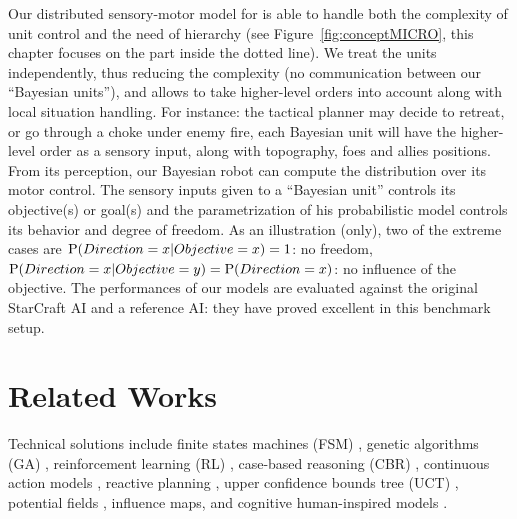 Our distributed sensory-motor model for  is able to handle both the complexity of unit control and the need of hierarchy (see Figure~\ref{fig:conceptMICRO}, this chapter focuses on the part inside the dotted line). We treat the units independently, thus reducing the complexity (no communication between our ``Bayesian units''), and allows to take higher-level orders into account along with local situation handling. For instance: the tactical planner may decide to retreat, or go through a choke under enemy fire, each Bayesian unit will have the higher-level order as a sensory input, along with topography, foes and allies positions. From its perception, our Bayesian robot \cite{Lebeltel04} can compute the distribution over its motor control. The sensory inputs given to a ``Bayesian unit'' controls its objective(s) or goal(s) and the parametrization of his probabilistic model controls its behavior and degree of freedom. As an illustration (only), two of the extreme cases are $\mathrm{P}(Direction=x|Objective=x)=1$: no freedom, $\mathrm{P}(Direction=x|Objective=y)=\mathrm{P}(Direction=x)$: no influence of the objective. The performances of our models are evaluated against the original StarCraft AI and a reference AI: they have proved excellent in this benchmark setup.


\section{Related Works}
Technical solutions include finite states machines (FSM) \citep{FSM}, genetic algorithms (GA) \citep{GA,teamCompositionRTS}, reinforcement learning (RL) \citep{Marthi05concurrenthierarchical,Madeira06}, case-based reasoning (CBR) \citep{LTW,CBR-RL}, continuous action models \citep{Molineaux08}, reactive planning \citep{WeberCIG10}, upper confidence bounds tree (UCT) \citep{UCT}, potential fields \citep{Hagelback2009}, influence maps\citep{teamCompositionRTS}, and cognitive human-inspired models \citep{SORTS}.

